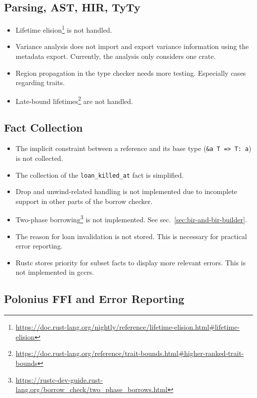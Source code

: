 \documentclass[
  11pt,
  twoside,symmetric]{report}
\providecommand{\tightlist}{%
  \setlength{\itemsep}{0pt}\setlength{\parskip}{0pt}}
\DeclareRobustCommand{\href}[2]{#2\footnote{\url{#1}}}
\begin{document}
\subsection{Parsing, AST, HIR, TyTy}\label{parsing-ast-hir-tyty}

\begin{itemize}
\tightlist
\item
  \href{https://doc.rust-lang.org/nightly/reference/lifetime-elision.html\#lifetime-elision}{Lifetime
  elision} is not handled.
\item
  Variance analysis does not import and export variance information
  using the metadata export. Currently, the analysis only considers one
  crate.
\item
  Region propagation in the type checker needs more testing. Especially
  cases regarding traits.
\item
  \href{https://doc.rust-lang.org/reference/trait-bounds.html\#higher-ranked-trait-bounds}{Late-bound
  lifetimes} are not handled.
\end{itemize}

\subsection{Fact Collection}\label{fact-collection}

\begin{itemize}
\tightlist
\item
  The implicit constraint between a reference and its base type
  (\texttt{\&\textquotesingle{}a\ T\ =\textgreater{}\ T:\ \textquotesingle{}a})
  is not collected.
\item
  The collection of the \texttt{loan\_killed\_at} fact is simplified.
\item
  Drop and unwind-related handling is not implemented due to incomplete
  support in other parts of the borrow checker.
\item
  \href{https://rustc-dev-guide.rust-lang.org/borrow_check/two_phase_borrows.html}{Two-phase
  borrowing} is not implemented. See sec.~\ref{sec:bir-and-bir-builder}.
\item
  The reason for loan invalidation is not stored. This is necessary for
  practical error reporting.
\item
  Rustc stores priority for subset facts to display more relevant
  errors. This is not implemented in gccrs.
\end{itemize}

\subsection{Polonius FFI and Error
Reporting}\label{polonius-ffi-and-error-reporting}
\end{document}
